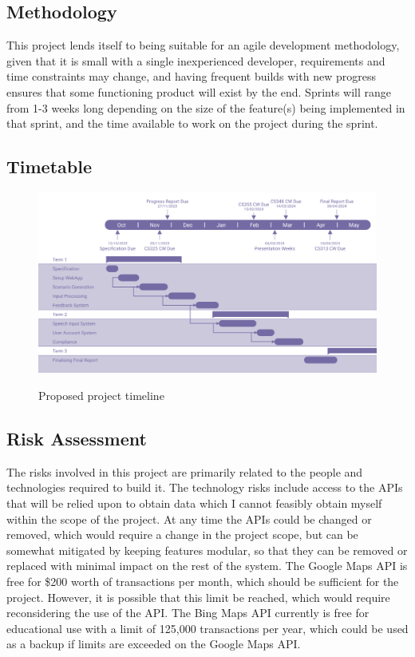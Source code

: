 \subsection{Methodology}
This project lends itself to being suitable for an agile development methodology, given that it is small with a single inexperienced developer, requirements and time constraints may change, and having frequent builds with new progress ensures that some functioning product will exist by the end. Sprints will range from 1-3 weeks long depending on the size of the feature(s) being implemented in that sprint, and the time available to work on the project during the sprint.

\subsection{Timetable}
\begin{figure}[h!]
    \centering
	\includegraphics[scale = 0.42]{../document-resources/images/initial-gantt.png}
    \label{initialgantt}
    \caption{Proposed project timeline}
\end{figure}

\subsection{Risk Assessment}
The risks involved in this project are primarily related to the people and technologies required to build it.
The technology risks include access to the APIs that will be relied upon to obtain data which I cannot feasibly obtain myself within the scope of the project.
At any time the APIs could be changed or removed, which would require a change in the project scope, but can be somewhat mitigated by keeping features modular, so that they can be removed or replaced with minimal impact on the rest of the system.
The Google Maps API is free for \$200 worth of transactions per month, which should be sufficient for the project. However, it is possible that this limit be reached, which would require reconsidering the use of the API.
The Bing Maps API currently is free for educational use with a limit of 125,000 transactions per year, which could be used as a backup if limits are exceeded on the Google Maps API.
